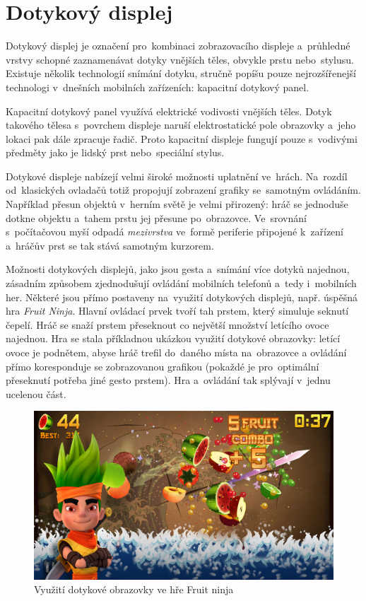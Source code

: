\documentclass[thesis=B,czech,hidelinks]{FITthesis}[2012/06/26] %
\begin{document}
\section{Dotykový displej}
\label{section:touchscreen}

Dotykový displej je označení pro~kombinaci zobrazovacího displeje a~průhledné vrstvy schopné zaznamenávat dotyky vnějších těles, obvykle prstu nebo~stylusu. Existuje několik technologií snímání dotyku, stručně popíšu pouze nejrozšířenejší technologi v~dnešních mobilních zařízeních: kapacitní dotykový panel.

Kapacitní dotykový panel využívá elektrické vodivosti vnějších těles. Dotyk takového tělesa s~povrchem displeje naruší elektrostatické pole obrazovky a~jeho lokaci pak dále zpracuje řadič. Proto kapacitní displeje fungují pouze s~vodivými předměty jako je lidský prst nebo~speciální stylus. \cite{gray2013does}

Dotykové displeje nabízejí velmi široké možnosti uplatnění ve~hrách. Na~rozdíl od~klasických ovladačů totiž propojují zobrazení grafiky se~samotným ovládáním. Například přesun objektů v~herním světě je velmi přirozený: hráč se jednoduše dotkne objektu a~tahem prstu jej přesune po~obrazovce. Ve~srovnání s~počítačovou myší odpadá \textit{mezivrstva} ve~formě periferie připojené k~zařízení a~hráčův prst se tak stává samotným kurzorem.

Možnosti dotykových displejů, jako jsou gesta a~snímání více dotyků najednou, zásadním způsobem zjednodušují ovládání mobilních telefonů a~tedy i~mobilních her. Některé jsou přímo postaveny na~využití dotykových displejů, např. úspěšná hra \textit{Fruit Ninja}\cite{fruitninja}. Hlavní ovládací prvek tvoří tah prstem, který simuluje seknutí čepelí. Hráč se snaží prstem přeseknout co největší množství letícího ovoce najednou. Hra se stala příkladnou ukázkou využití dotykové obrazovky: letící ovoce je podnětem, abyse hráč trefil do~daného místa na~obrazovce a ovládání přímo koresponduje se zobrazovanou grafikou (pokaždé je pro~optimální přeseknutí potřeba jiné gesto prstem). Hra a~ovládání tak splývají v~jednu ucelenou část.

\begin{figure}
\includegraphics[width=\textwidth]{fruit_ninja}
\caption{Využití dotykové obrazovky ve hře Fruit ninja\cite{fruitninja}}
\end{figure}
\end{document}
